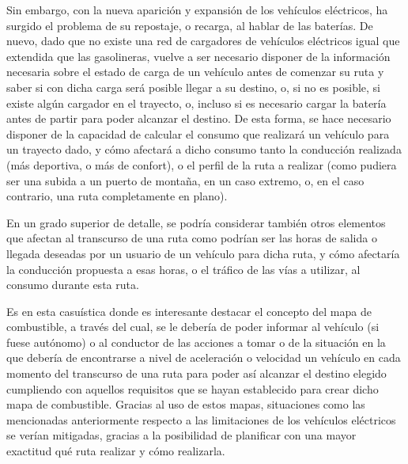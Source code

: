 \documentclass[11pt,spanish,listoffigures,listoftables]{tfgetsinf}
\begin{document}
Sin embargo, con la nueva aparición y expansión de los vehículos eléctricos, ha surgido el problema de su repostaje, o recarga, al hablar de las baterías. De nuevo, dado que no existe una red de cargadores de vehículos eléctricos igual que extendida que las gasolineras, vuelve a ser necesario disponer de la información necesaria sobre el estado de carga de un vehículo antes de comenzar su ruta y saber si con dicha carga será posible llegar a su destino, o, si no es posible, si existe algún cargador en el trayecto, o, incluso si es necesario cargar la batería antes de partir para poder alcanzar el destino. De esta forma, se hace necesario disponer de la capacidad de calcular el consumo que realizará un vehículo para un trayecto dado, y cómo afectará a dicho consumo tanto la conducción realizada (más deportiva, o más de confort), o el perfil de la ruta a realizar (como pudiera ser una subida a un puerto de montaña, en un caso extremo, o, en el caso contrario, una ruta completamente en plano).

En un grado superior de detalle, se podría considerar también otros elementos que afectan al transcurso de una ruta como podrían ser las horas de salida o llegada deseadas por un usuario de un vehículo para dicha ruta, y cómo afectaría la conducción propuesta a esas horas, o el tráfico de las vías a utilizar, al consumo durante esta ruta.

Es en esta casuística donde es interesante destacar el concepto del mapa de combustible, a través del cual, se le debería de poder informar al vehículo (si fuese autónomo) o al conductor de las acciones a tomar o de la situación en la que debería de encontrarse a nivel de aceleración o velocidad un vehículo en cada momento del transcurso de una ruta para poder así alcanzar el destino elegido cumpliendo con aquellos requisitos que se hayan establecido para crear dicho mapa de combustible. Gracias al uso de estos mapas, situaciones como las mencionadas anteriormente respecto a las limitaciones de los vehículos eléctricos se verían mitigadas, gracias a la posibilidad de planificar con una mayor exactitud qué ruta realizar y cómo realizarla.
\end{document}
